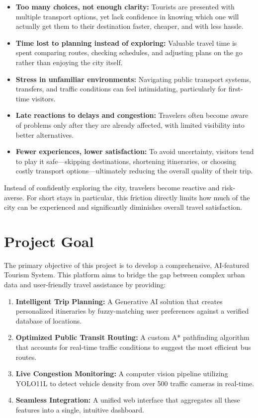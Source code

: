 \begin{itemize}
  \item \textbf{Too many choices, not enough clarity:} Tourists are presented with multiple transport options, yet lack confidence in knowing which one will actually get them to their destination faster, cheaper, and with less hassle.
  
  \item \textbf{Time lost to planning instead of exploring:} Valuable travel time is spent comparing routes, checking schedules, and adjusting plans on the go rather than enjoying the city itself.
  
  \item \textbf{Stress in unfamiliar environments:} Navigating public transport systems, transfers, and traffic conditions can feel intimidating, particularly for first-time visitors.
  
  \item \textbf{Late reactions to delays and congestion:} Travelers often become aware of problems only after they are already affected, with limited visibility into better alternatives.
  
  \item \textbf{Fewer experiences, lower satisfaction:} To avoid uncertainty, visitors tend to play it safe—skipping destinations, shortening itineraries, or choosing costly transport options—ultimately reducing the overall quality of their trip.
\end{itemize}

Instead of confidently exploring the city, travelers become reactive and risk-averse. For short stays in particular, this friction directly limits how much of the city can be experienced and significantly diminishes overall travel satisfaction.


\section{Project Goal}
The primary objective of this project is to develop a comprehensive, AI-featured Tourism System. This platform aims to bridge the gap between complex urban data and user-friendly travel assistance by providing:
\begin{enumerate}
    \item \textbf{Intelligent Trip Planning:} A Generative AI solution that creates personalized itineraries by fuzzy-matching user preferences against a verified database of locations.
    \item \textbf{Optimized Public Transit Routing:} A custom A* pathfinding algorithm that accounts for real-time traffic conditions to suggest the most efficient bus routes.
    \item \textbf{Live Congestion Monitoring:} A computer vision pipeline utilizing YOLO11L to detect vehicle density from over 500 traffic cameras in real-time.
    \item \textbf{Seamless Integration:} A unified web interface that aggregates all these features into a single, intuitive dashboard.
\end{enumerate}


